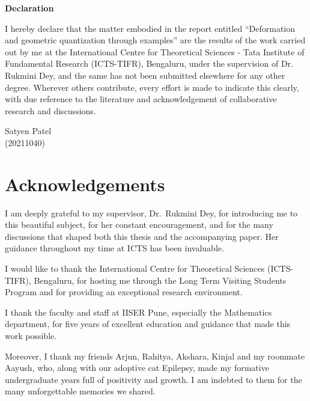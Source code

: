 \documentclass[
  12pt,
  a4paper, oneside
]{report}
\theoremstyle{bolddef}
\theoremstyle{remark}
\numberwithin{equation}{chapter}
\begin{document}
\clearpage
\begin{titlepage}

\begin{center}
{\huge \bfseries Declaration}\\[2.5cm]
\end{center}

I hereby declare that the matter embodied in the report entitled “Deformation and geometric quantization through examples” are the results of the work carried out by me at the International Centre for Theoretical Sciences - Tata Institute of Fundamental Research (ICTS-TIFR), Bengaluru, under the
supervision of Dr. Rukmini Dey, and the same has not been submitted elsewhere for any other degree. Wherever others contribute, every effort is made to indicate this clearly, with due reference to the literature and acknowledgement of collaborative research and discussions.\\[6cm]

\begin{flushright}
Satyen Patel \\
(20211040)
\end{flushright}

\end{titlepage}
\tableofcontents
\clearpage
\renewcommand{\cftchapleader}{\cftdotfill{\cftnodots}}

\chapter*{Acknowledgements}

I am deeply grateful to my supervisor, Dr.\ Rukmini Dey, for introducing me to this beautiful subject, for her constant encouragement, and for the many discussions that shaped both this thesis and the accompanying paper. Her guidance throughout my time at ICTS has been invaluable.

I would like to thank the International Centre for Theoretical Sciences (ICTS-TIFR), Bengaluru, for hosting me through the Long Term Visiting Students Program and for providing an exceptional research environment.

I thank the faculty and staff at IISER Pune, especially the Mathematics department, for five years of excellent education and guidance that made this work possible.

Moreover, I thank my friends Arjun, Rahitya, Akshara, Kinjal and my roommate Aayush, who, along with our adoptive cat Epilepsy, made my formative undergraduate years full of positivity and growth. I am indebted to them for the many unforgettable memories we shared. 
\end{document}
